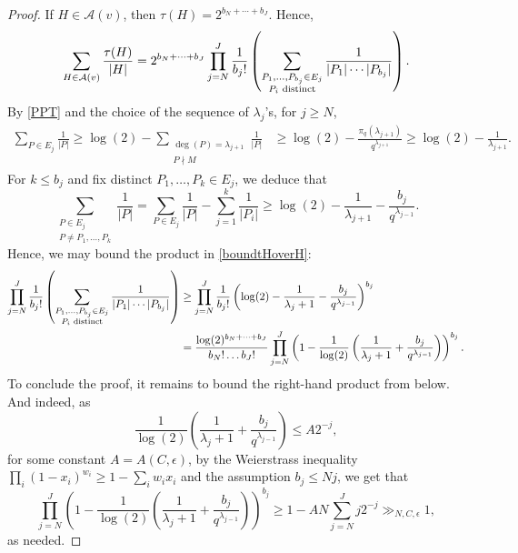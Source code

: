 \documentclass[12pt]{amsart}
\numberwithin{equation}{section}
\theoremstyle{definition}
\theoremstyle{remark}
\begin{document}
\begin{proof}
    If $H \in \mathcal{A}(v)$, then $\tau(H) = 2^{b_N+ \dotsb +b_J}$. Hence,
    \begin{equation}\label{boundtHoverH}
        \sum_{H\in\mathcal{A}(v)} \frac{\tau (H)}{|H|} = 2^{b_N+ \dotsb +b_J} \prod_{j=N}^J \frac{1}{b_j !} \left(\sum_{\substack{P_1, \dotsc, P_{b_j} \in E_j \\ P_i \textnormal{ distinct}}} \frac{1}{|P_1| \dotsb |P_{b_j}|}\right).
    \end{equation}
    By \eqref{PPT} and the choice of the sequence of $\lambda_j$'s, for $j \geq N$,
    \begin{align*}
        \sum_{P \in E_j} \frac{1}{|P|} \geq \log(2) - \sum_{\substack{\deg(P)=\lambda_{j+1} \\ P \nmid M}} \frac{1}{|P|} &\geq \log(2) - \frac{\pi_q(\lambda_{j+1})}{q^{\lambda_{j+1}}} %
        \geq \log(2) - \frac{1}{\lambda_{j+1}}.
    \end{align*}
    For $k\leq b_j$ and fix distinct $P_1, \dotsc ,P_k \in E_j$, we deduce that
    \begin{equation*}
        \sum_{\substack{P \in E_j \\ P \neq P_1, \dotsc ,P_k}} \frac{1}{|P|} = \sum_{P \in E_j}\frac{1}{|P|} - \sum_{j=1}^k \frac{1}{|P_i|} \geq \log(2) - \frac{1}{\lambda_{j+1}} - \frac{b_j}{q^{\lambda_{j-1}}}.
    \end{equation*}
    Hence, we may bound the product in \eqref{boundtHoverH}:
    \begin{align*}
        \prod_{j=N}^J \frac{1}{b_j !} \left(\sum_{\substack{P_1, \dotsc, P_{b_j} \in E_j \\ P_i \textnormal{ distinct}}} \frac{1}{|P_1| \dotsb |P_{b_j}|}\right) &\geq \prod_{j=N}^J \frac{1}{b_j !} \left( \log(2) - \frac{1}{\lambda_j+1} - \frac{b_j}{q^{\lambda_{j-1}}}\right)^{b_j} \\
        &= \frac{\log(2)^{b_N + \dotsb + b_J}}{b_N!\dots b_J!}  \prod_{j=N}^J \left( 1 - \frac{1}{\log(2)} \left(\frac{1}{\lambda_j+1} + \frac{b_j}{q^{\lambda_{j-1}}}\right)\right)^{b_j}.
    \end{align*}
    To conclude the proof, it remains to bound the right-hand product from below.
    And indeed, as 
    \[
        \frac{1}{\log(2)} \left(\frac{1}{\lambda_j+1} + \frac{b_j}{q^{\lambda_{j-1}}}\right) \leq A 2^{-j}, 
    \]
    for some constant $A=A(C,\epsilon)$, 
    by the Weierstrass inequality $\prod_{i}(1-x_i)^{w_i}\geq 1-\sum_{i}w_ix_i$ and the assumption $b_j\leq Nj$, we get that 
    \[
        \prod_{j=N}^J \left( 1 - \frac{1}{\log(2)} \left(\frac{1}{\lambda_j+1} + \frac{b_j}{q^{\lambda_{j-1}}}\right)\right)^{b_j} \geq 1-A N\sum_{j=N}^{J} j2^{-j} \gg_{N,C,\epsilon} 1, 
    \]
    as needed.
\end{proof}
\end{document}
